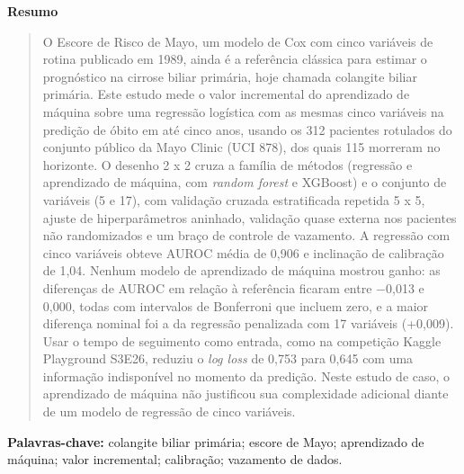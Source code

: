 \begin{center}
\textbf{\sffamily Resumo}
\end{center}
\vspace{-0.85em}
\begin{quote}
\small
O Escore de Risco de Mayo, um modelo de Cox com cinco variáveis de rotina publicado em 1989, ainda é a referência clássica para estimar o prognóstico na cirrose biliar primária, hoje chamada colangite biliar primária. Este estudo mede o valor incremental do aprendizado de máquina sobre uma regressão logística com as mesmas cinco variáveis na predição de óbito em até cinco anos, usando os 312 pacientes rotulados do conjunto público da Mayo Clinic (UCI 878), dos quais 115 morreram no horizonte. O desenho 2 x 2 cruza a família de métodos (regressão e aprendizado de máquina, com \textit{random forest} e XGBoost) e o conjunto de variáveis (5 e 17), com validação cruzada estratificada repetida 5 x 5, ajuste de hiperparâmetros aninhado, validação quase externa nos pacientes não randomizados e um braço de controle de vazamento. A regressão com cinco variáveis obteve AUROC média de 0,906 e inclinação de calibração de 1,04. Nenhum modelo de aprendizado de máquina mostrou ganho: as diferenças de AUROC em relação à referência ficaram entre $-$0,013 e 0,000, todas com intervalos de Bonferroni que incluem zero, e a maior diferença nominal foi a da regressão penalizada com 17 variáveis (+0,009). Usar o tempo de seguimento como entrada, como na competição Kaggle Playground S3E26, reduziu o \textit{log loss} de 0,753 para 0,645 com uma informação indisponível no momento da predição. Neste estudo de caso, o aprendizado de máquina não justificou sua complexidade adicional diante de um modelo de regressão de cinco variáveis.
\end{quote}
\vspace{-0.35em}
\noindent\textbf{Palavras-chave:} colangite biliar primária; escore de Mayo; aprendizado de máquina; valor incremental; calibração; vazamento de dados.
\vspace{0.55em}
